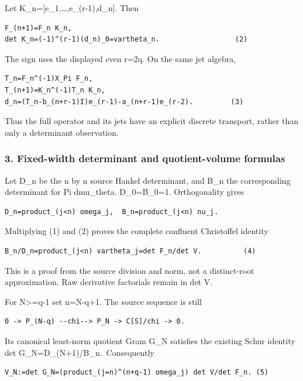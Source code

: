 Let K\_n={[}e\_1,\ldots,e\_(r-1),d\_n{]}. Then

\begin{verbatim}
F_(n+1)=F_n K_n,
det K_n=(-1)^(r-1)(d_n)_0=vartheta_n.                  (2)
\end{verbatim}

The sign uses the displayed even r=2q. On the same jet algebra,

\begin{verbatim}
T_n=F_n^(-1)X_Pi F_n,
T_(n+1)=K_n^(-1)T_n K_n,
d_n=(T_n-b_(n+r-1)I)e_(r-1)-a_(n+r-1)e_(r-2).         (3)
\end{verbatim}

Thus the full operator and its jets have an explicit discrete transport, rather than only a determinant observation.

\subsubsection{3. Fixed-width determinant and quotient-volume formulas}\label{endpoint-pr24_current_corrected--fixed-width-determinant-and-quotient-volume-formulas}

Let D\_n be the n by n source Hankel determinant, and B\_n the corresponding determinant for Pi dmu\_theta. D\_0=B\_0=1. Orthogonality gives

\begin{verbatim}
D_n=product_(j<n) omega_j,  B_n=product_(j<n) nu_j.
\end{verbatim}

Multiplying (1) and (2) proves the complete confluent Christoffel identity

\begin{verbatim}
B_n/D_n=product_(j<n) vartheta_j=det F_n/det V.          (4)
\end{verbatim}

This is a proof from the source division and norm, not a distinct-root approximation. Raw derivative factorials remain in det V.

For N\textgreater=q-1 set n=N-q+1. The source sequence is still

\begin{verbatim}
0 -> P_(N-q) --chi--> P_N -> C[S]/chi -> 0.
\end{verbatim}

Its canonical least-norm quotient Gram G\_N satisfies the existing Schur identity det G\_N=D\_(N+1)/B\_n.~Consequently

\begin{verbatim}
V_N:=det G_N=(product_(j=n)^(n+q-1) omega_j) det V/det F_n. (5)
\end{verbatim}

